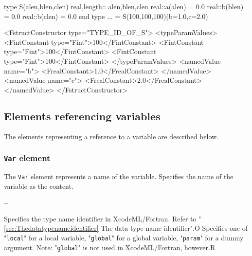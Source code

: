 \begin{Fexample2008}
type S(alen,blen,clen)
real,length:: alen,blen,clen
real::a(alen) = 0.0
real::b(blen) = 0.0
real::b(clen) = 0.0
end type
... = S(100,100,100)(b=1.0,c=2.0)
\end{Fexample2008}
\vspace{1mm}

\begin{XcodeMLFExample}
<FstructConstructor type="TYPE_ID_OF_S">
  <typeParamValues>
    <FintConstant type="Fint">100</FintConstant>
    <FintConstant type="Fint">100</FintConstant>
    <FintConstant type="Fint">100</FintConstant>
  </typeParamValues>
  <namedValue name="b">
     <FrealConstant>1.0</FrealConstant>
  </namedValue>
  <namedValue name="c">
     <FrealConstant>2.0</FrealConstant>
  </namedValue>
</FstructConstructor>
\end{XcodeMLFExample}


\subsection{Elements referencing variables}

The elements representing a reference to a variable are described below.

\subsubsection{ {\tt Var} element}

The {\tt Var} element represents a name of the variable.
Specifies the name of the variable as the content.


\begin{XcodeMLChildElements}
\XcodeMLElementDef{-}
{-}{-}
\end{XcodeMLChildElements}

\begin{XcodeMLAttributes}
{Specifies the type name identifier in XcodeML/Fortran.
 Refer to "\ref{sec:Thedatatypenameidentifier} The data type name identifier".}{O}
{Specifies one of
\newline
"{\tt local}" for a local variable,
\newline
"{\tt global}" for a global variable,
\newline
"{\tt param}" for a dummy argument.
\newline
Note: "{\tt global}" is not used in XcodeML/Fortran, however.}{R}
\end{XcodeMLAttributes}


